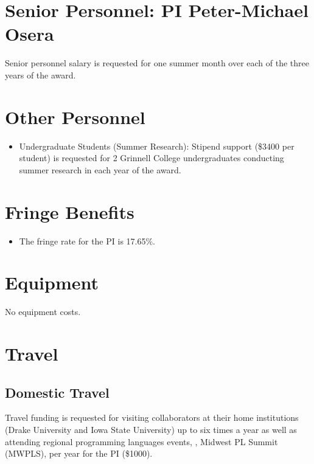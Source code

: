 \documentclass[11pt]{article}
\begin{document}
\startdoc{\shorttitle}

\renewcommand{\thesection}{\Alph{section}}

\section{Senior Personnel: PI Peter-Michael Osera}

Senior personnel salary is requested for one summer month over each of the three years of the award.

\section{Other Personnel}

\begin{itemize}
  \item Undergraduate Students (Summer Research): Stipend support (\$3400 per student) is requested for 2 Grinnell College undergraduates conducting summer research in each year of the award.
\end{itemize}

\section{Fringe Benefits}

\begin{itemize}[itemsep=0pt]
  \item The fringe rate for the PI is 17.65\%.
\end{itemize}

\section{Equipment}

No equipment costs.

\section{Travel}

\subsection{Domestic Travel}

Travel funding is requested for visiting collaborators at their home institutions (Drake University and Iowa State University) up to six times a year as well as attending regional programming languages events, \eg, Midwest PL Summit (MWPLS), per year for the PI (\$1000).
\end{document}
